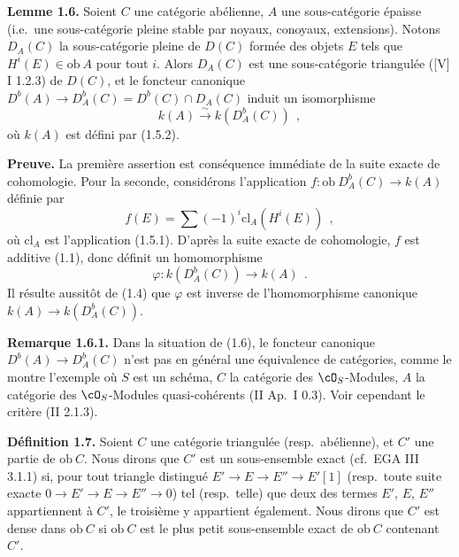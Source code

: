 \medskip

\noindent\textbf{Lemme 1.6.} Soient $C$ une cat\'{e}gorie ab\'{e}lienne, $A$ une sous-cat\'{e}gorie \'{e}paisse (i.e.\ une sous-cat\'{e}gorie pleine stable par noyaux, conoyaux, extensions). Notons $D_A(C)$ la sous-cat\'{e}gorie pleine de $D(C)$ form\'{e}e des objets $E$ tels que $H^i(E) \in \mathrm{ob}\ A$ pour tout $i$. Alors $D_A(C)$ est une sous-cat\'{e}gorie triangul\'{e}e ([V] I 1.2.3) de $D(C)$, et le foncteur canonique $D^b(A) \longrightarrow D_A^b(C) = D^b(C) \cap D_A(C)$ induit un isomorphisme
\[
k(A) \xrightarrow{\sim} k(D_A^b(C))\ \ ,
\]
o\`{u} $k(A)$ est d\'{e}fini par (1.5.2).

\medskip

\noindent\textbf{Preuve.} La premi\`{e}re assertion est cons\'{e}quence imm\'{e}diate de la suite exacte de cohomologie. Pour la seconde, consid\'{e}rons l'application $f : \mathrm{ob}\ D_A^b(C) \longrightarrow k(A)$ d\'{e}finie par
\[
f(E) = \sum (-1)^i \mathrm{cl}_A(H^i(E))\ \ ,
\]
o\`{u} $\mathrm{cl}_A$ est l'application (1.5.1). D'apr\`{e}s la suite exacte de cohomologie, $f$ est additive (1.1), donc d\'{e}finit un homomorphisme
\[
\varphi : k(D_A^b(C)) \longrightarrow k(A)\ \ .
\]
Il r\'{e}sulte aussit\^{o}t de (1.4) que $\varphi$ est inverse de l'homomorphisme canonique $k(A) \longrightarrow k(D_A^b(C))$.

\medskip

\noindent\textbf{Remarque 1.6.1.} Dans la situation de (1.6), le foncteur canonique $D^b(A) \longrightarrow D_A^b(C)$ n'est pas en g\'{e}n\'{e}ral une \'{e}quivalence de cat\'{e}gories, comme le montre l'exemple o\`{u} $S$ est un sch\'{e}ma, $C$ la cat\'{e}gorie des $\cO_S$-Modules, $A$ la cat\'{e}gorie des $\cO_S$-Modules quasi-coh\'{e}rents (II Ap.\ I 0.3). Voir cependant le crit\`{e}re (II 2.1.3).

\medskip

\noindent\textbf{D\'{e}finition 1.7.} Soient $C$ une cat\'{e}gorie triangul\'{e}e (resp.\ ab\'{e}lienne), et $C'$ une partie de $\mathrm{ob}\ C$. Nous dirons que $C'$ est un sous-ensemble exact (cf.\ EGA III 3.1.1) si, pour tout triangle distingu\'{e} $E' \longrightarrow E \longrightarrow E'' \longrightarrow E'[1]$ (resp.\ toute suite exacte $0 \longrightarrow E' \longrightarrow E \longrightarrow E'' \longrightarrow 0$) tel (resp.\ telle) que deux des termes $E'$, $E$, $E''$ appartiennent \`{a} $C'$, le troisi\`{e}me y appartient \'{e}galement. Nous dirons que $C'$ est dense dans $\mathrm{ob}\ C$ si $\mathrm{ob}\ C$ est le plus petit sous-ensemble exact de $\mathrm{ob}\ C$ contenant $C'$.

